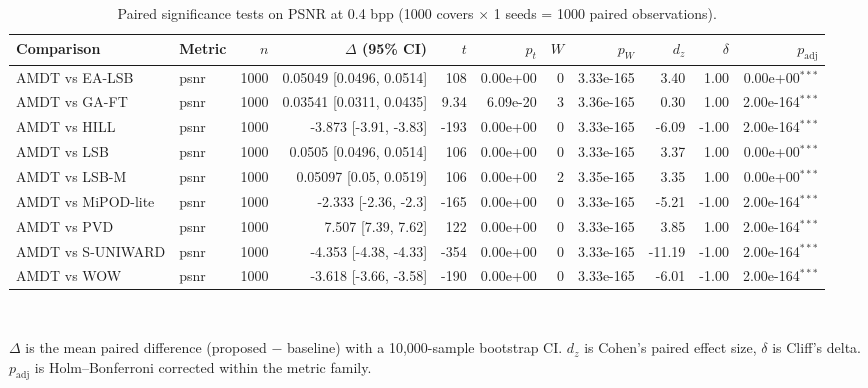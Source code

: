 \begin{table}[!t]
\centering
\caption{Paired significance tests on PSNR at 0.4 bpp (1000 covers $\times$ 1 seeds = 1000 paired observations).}
\label{tab:significance}
\footnotesize
\begin{tabular}{llrrrrrrrrr}
\toprule
Comparison & Metric & $n$ & $\Delta$ (95\% CI) & $t$ & $p_t$ & $W$ & $p_W$ & $d_z$ & $\delta$ & $p_{\text{adj}}$ \\
\midrule
AMDT vs EA-LSB & psnr & 1000 & 0.05049 [0.0496, 0.0514] & 108 & 0.00e+00 & 0 & 3.33e-165 & 3.40 & 1.00 & 0.00e+00$^{***}$ \\
AMDT vs GA-FT & psnr & 1000 & 0.03541 [0.0311, 0.0435] & 9.34 & 6.09e-20 & 3 & 3.36e-165 & 0.30 & 1.00 & 2.00e-164$^{***}$ \\
AMDT vs HILL & psnr & 1000 & -3.873 [-3.91, -3.83] & -193 & 0.00e+00 & 0 & 3.33e-165 & -6.09 & -1.00 & 2.00e-164$^{***}$ \\
AMDT vs LSB & psnr & 1000 & 0.0505 [0.0496, 0.0514] & 106 & 0.00e+00 & 0 & 3.33e-165 & 3.37 & 1.00 & 0.00e+00$^{***}$ \\
AMDT vs LSB-M & psnr & 1000 & 0.05097 [0.05, 0.0519] & 106 & 0.00e+00 & 2 & 3.35e-165 & 3.35 & 1.00 & 0.00e+00$^{***}$ \\
AMDT vs MiPOD-lite & psnr & 1000 & -2.333 [-2.36, -2.3] & -165 & 0.00e+00 & 0 & 3.33e-165 & -5.21 & -1.00 & 2.00e-164$^{***}$ \\
AMDT vs PVD & psnr & 1000 & 7.507 [7.39, 7.62] & 122 & 0.00e+00 & 0 & 3.33e-165 & 3.85 & 1.00 & 2.00e-164$^{***}$ \\
AMDT vs S-UNIWARD & psnr & 1000 & -4.353 [-4.38, -4.33] & -354 & 0.00e+00 & 0 & 3.33e-165 & -11.19 & -1.00 & 2.00e-164$^{***}$ \\
AMDT vs WOW & psnr & 1000 & -3.618 [-3.66, -3.58] & -190 & 0.00e+00 & 0 & 3.33e-165 & -6.01 & -1.00 & 2.00e-164$^{***}$ \\
\bottomrule
\end{tabular}
\\[2pt] \parbox{\linewidth}{\scriptsize $\Delta$ is the mean paired difference (proposed $-$ baseline) with a 10{,}000-sample bootstrap CI. $d_z$ is Cohen's paired effect size, $\delta$ is Cliff's delta. $p_{\text{adj}}$ is Holm--Bonferroni corrected within the metric family.}
\end{table}
